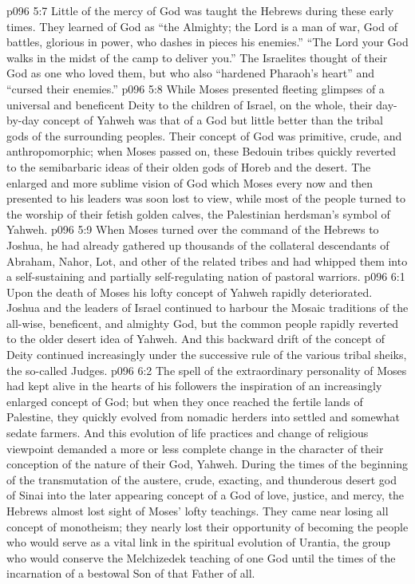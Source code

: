 \vs p096 5:7 Little of the mercy of God was taught the Hebrews during these early times. They learned of God as “the Almighty; the Lord is a man of war, God of battles, glorious in power, who dashes in pieces his enemies.” “The Lord your God walks in the midst of the camp to deliver you.” The Israelites thought of their God as one who loved them, but who also “hardened Pharaoh’s heart” and “cursed their enemies.”
\vs p096 5:8 While Moses presented fleeting glimpses of a universal and beneficent Deity to the children of Israel, on the whole, their day\hyp{}by\hyp{}day concept of Yahweh was that of a God but little better than the tribal gods of the surrounding peoples. Their concept of God was primitive, crude, and anthropomorphic; when Moses passed on, these Bedouin tribes quickly reverted to the semibarbaric ideas of their olden gods of Horeb and the desert. The enlarged and more sublime vision of God which Moses every now and then presented to his leaders was soon lost to view, while most of the people turned to the worship of their fetish golden calves, the Palestinian herdsman’s symbol of Yahweh.
\vs p096 5:9 \pc When Moses turned over the command of the Hebrews to Joshua, he had already gathered up thousands of the collateral descendants of Abraham, Nahor, Lot, and other of the related tribes and had whipped them into a self\hyp{}sustaining and partially self\hyp{}regulating nation of pastoral warriors.
\vs p096 6:1 Upon the death of Moses his lofty concept of Yahweh rapidly deteriorated. Joshua and the leaders of Israel continued to harbour the Mosaic traditions of the all\hyp{}wise, beneficent, and almighty God, but the common people rapidly reverted to the older desert idea of Yahweh. And this backward drift of the concept of Deity continued increasingly under the successive rule of the various tribal sheiks, the so\hyp{}called Judges.
\vs p096 6:2 The spell of the extraordinary personality of Moses had kept alive in the hearts of his followers the inspiration of an increasingly enlarged concept of God; but when they once reached the fertile lands of Palestine, they quickly evolved from nomadic herders into settled and somewhat sedate farmers. And this evolution of life practices and change of religious viewpoint demanded a more or less complete change in the character of their conception of the nature of their God, Yahweh. During the times of the beginning of the transmutation of the austere, crude, exacting, and thunderous desert god of Sinai into the later appearing concept of a God of love, justice, and mercy, the Hebrews almost lost sight of Moses’ lofty teachings. They came near losing all concept of monotheism; they nearly lost their opportunity of becoming the people who would serve as a vital link in the spiritual evolution of Urantia, the group who would conserve the Melchizedek teaching of one God until the times of the incarnation of a bestowal Son of that Father of all.

